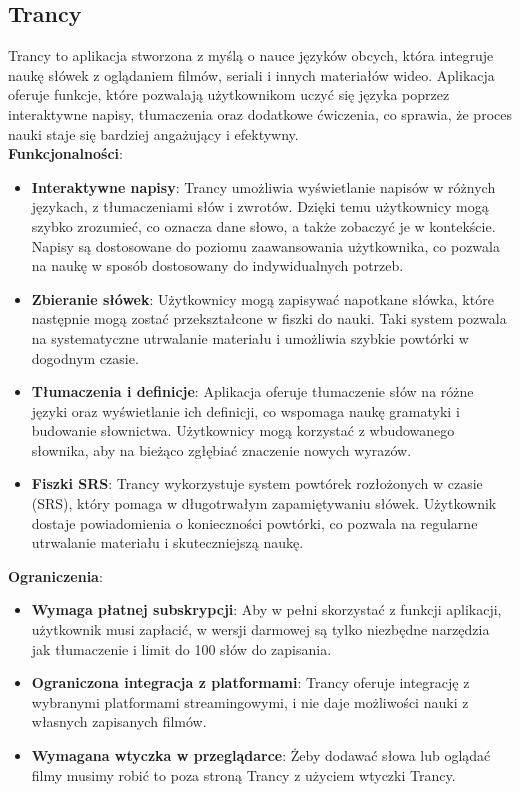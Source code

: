 \subsection{Trancy}
Trancy to aplikacja stworzona z myślą o nauce języków obcych, która integruje naukę słówek z oglądaniem filmów, seriali i innych materiałów wideo. Aplikacja oferuje funkcje, które pozwalają użytkownikom uczyć się języka poprzez interaktywne napisy, tłumaczenia oraz dodatkowe ćwiczenia, co sprawia, że proces nauki staje się bardziej angażujący i efektywny. \\
\textbf{Funkcjonalności}:
\begin{itemize}
    \item \textbf{Interaktywne napisy}: Trancy umożliwia wyświetlanie napisów w różnych językach, z tłumaczeniami słów i zwrotów. Dzięki temu użytkownicy mogą szybko zrozumieć, co oznacza dane słowo, a także zobaczyć je w kontekście. Napisy są dostosowane do poziomu zaawansowania użytkownika, co pozwala na naukę w sposób dostosowany do indywidualnych potrzeb.
    \item \textbf{Zbieranie słówek}: Użytkownicy mogą zapisywać napotkane słówka, które następnie mogą zostać przekształcone w fiszki do nauki. Taki system pozwala na systematyczne utrwalanie materiału i umożliwia szybkie powtórki w dogodnym czasie.
    \item \textbf{Tłumaczenia i definicje}: Aplikacja oferuje tłumaczenie słów na różne języki oraz wyświetlanie ich definicji, co wspomaga naukę gramatyki i budowanie słownictwa. Użytkownicy mogą korzystać z wbudowanego słownika, aby na bieżąco zgłębiać znaczenie nowych wyrazów.
    \item \textbf{Fiszki SRS}: Trancy wykorzystuje system powtórek rozłożonych w czasie (SRS), który pomaga w długotrwałym zapamiętywaniu słówek. Użytkownik dostaje powiadomienia o konieczności powtórki, co pozwala na regularne utrwalanie materiału i skuteczniejszą naukę.
\end{itemize}
\textbf{Ograniczenia}:
\begin{itemize}
    \item \textbf{Wymaga płatnej subskrypcji}: Aby w pełni skorzystać z funkcji aplikacji, użytkownik musi zapłacić, w wersji darmowej są tylko niezbędne narzędzia jak tłumaczenie i limit do 100 słów do zapisania.
    \item \textbf{Ograniczona integracja z platformami}: Trancy oferuje integrację z wybranymi platformami streamingowymi, i nie daje możliwości nauki z własnych zapisanych filmów.
    \item \textbf{Wymagana wtyczka w przeglądarce}: Żeby dodawać słowa lub oglądać filmy musimy robić to poza stroną Trancy z użyciem wtyczki Trancy.
\end{itemize}

